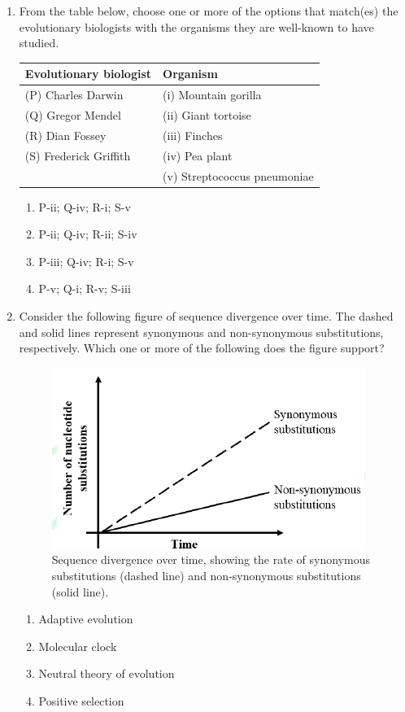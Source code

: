\documentclass[journal]{IEEEtran}
\begin{document}
\begin{enumerate}
    \item From the table below, choose one or more of the options that match(es) the evolutionary biologists with the organisms they are well-known to have studied.
\begin{center}
    \begin{tabular}{|l|l|} \hline
    \textbf{Evolutionary biologist} & \textbf{Organism} \\ \hline
    (P) Charles Darwin & (i) Mountain gorilla \\
    (Q) Gregor Mendel & (ii) Giant tortoise \\
    (R) Dian Fossey & (iii) Finches \\
    (S) Frederick Griffith & (iv) Pea plant \\ 
    & (v) Streptococcus pneumoniae \\ \hline
    \end{tabular}
    \end{center}
    \begin{multicols}{2}
    \begin{enumerate}
        \item P-ii;
Q-iv; R-i; S-v
        \item P-ii; Q-iv; R-ii;
S-iv
        \item P-iii; Q-iv; R-i;
S-v
        \item P-v; Q-i; R-v;
S-iii
    \end{enumerate}
    \end{multicols}
    
    \item Consider the following figure of sequence divergence over time.
The dashed and solid lines represent synonymous and non-synonymous substitutions, respectively.
Which one or more of the following does the figure support?
\begin{figure}[!h]
        \centering
        \includegraphics[width=0.4\columnwidth]{figs/Q.60.png}
        \caption{Sequence divergence over time, showing the rate of synonymous substitutions (dashed line) and non-synonymous substitutions (solid line).}
        \label{fig:Q.60}
    \end{figure}
    \begin{enumerate}
        \item Adaptive evolution
        \item Molecular clock
        \item Neutral theory of evolution
        \item Positive selection
    \end{enumerate}
    

\end{enumerate}
\end{document}
